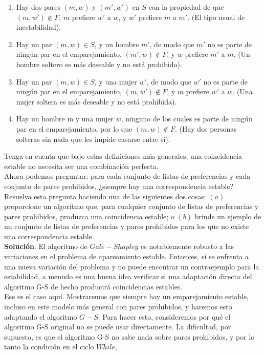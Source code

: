 \documentclass[a4paper]{article}
\begin{document}
\begin{enumerate}
    \item  Hay dos pares $(m,w)$ y $(m',w')$ en $S$ con la propiedad de que $(m,w')∉F$, $m$ prefiere $w'$ a $w$, y $w'$ prefiere $m$ a $m'$. (El tipo usual de inestabilidad).
    \item Hay un par $(m,w) \in S$, y un hombre $m'$, de modo que $m'$ no es parte de ningún par en el emparejamiento, $(m',w)∉F$, y $w$ prefiere $m'$ a $m$. (Un hombre soltero es más deseable y no está prohibido).
    \item  Hay un par $(m,w) \in S$, y una mujer $w'$, de modo que $w'$ no es parte de ningún par en el emparejamiento, $(m,w')∉F$, y $m$ prefiere $w'$ a $w$. (Una mujer soltera es más deseable y no está prohibida).
    \item Hay un hombre m y una mujer $w$, ninguno de los cuales es parte de ningún par en el emparejamiento, por lo que $(m,w)∉F$. (Hay dos personas solteras sin nada que les impide casarse entre sí).
   \end{enumerate}

Tenga en cuenta que bajo estas definiciones más generales, una coincidencia estable no necesita ser una combinación perfecta.\\

Ahora podemos preguntar: para cada conjunto de listas de preferencias y cada conjunto de pares prohibidos, ¿siempre hay una correspondencia estable? Resuelva esta pregunta haciendo una de las siguientes dos cosas: $(a)$ proporcione un algoritmo que, para cualquier conjunto de listas de preferencias y pares prohibidos, produzca una coincidencia estable; o $(b)$ brinde un ejemplo de un conjunto de listas de preferencias y pares prohibidos para los que no existe una correspondencia estable.\\

\textbf{Solución}. El algoritmo de $Gale-Shapley$ es notablemente robusto a las variaciones en el problema de apareamiento estable. Entonces, si se enfrenta a una nueva variación del problema y no puede encontrar un contraejemplo para la estabilidad, a menudo es una buena idea verificar si una adaptación directa del algoritmo G-S de hecho producirá coincidencias estables.\\

Ese es el caso aquí. Mostraremos que siempre hay un emparejamiento estable, incluso en este modelo más general con pares prohibidos, y haremos esto adaptando el algoritmo $G-S$. Para hacer esto, consideremos por qué el algoritmo G-S original no se puede usar directamente. La dificultad, por supuesto, es que el algoritmo G-S no sabe nada sobre pares prohibidos, y por lo tanto la condición en el ciclo $While$,\\
\end{document}

